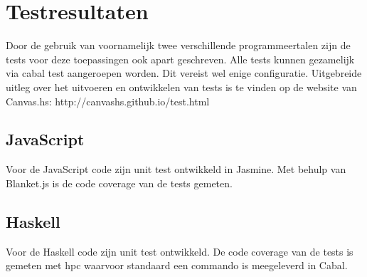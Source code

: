 \section{Testresultaten} \label{sec:testresultaten}

Door de gebruik van voornamelijk twee verschillende programmeertalen zijn de tests voor deze toepassingen ook apart geschreven. Alle tests kunnen gezamelijk via cabal test aangeroepen worden. Dit vereist wel enige configuratie. Uitgebreide uitleg over het uitvoeren en ontwikkelen van tests is te vinden op de website van Canvas.hs: http://canvashs.github.io/test.html

\subsection{JavaScript}
Voor de JavaScript code zijn unit test ontwikkeld in Jasmine. Met behulp van Blanket.js is de code coverage van de tests gemeten.

\subsection{Haskell}
Voor de Haskell code zijn unit test ontwikkeld. De code coverage van de tests is gemeten met hpc waarvoor standaard een commando is meegeleverd in Cabal.

